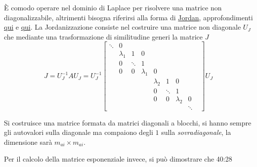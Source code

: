 È comodo operare nel dominio di Laplace per risolvere una matrice non
diagonalizzabile, altrimenti bisogna riferirsi alla forma di
\href{https://it.wikipedia.org/wiki/Forma_canonica_di_Jordan}{Jordan},
approfondimenti
\href{https://youtu.be/mD4zrWkgy0o?list=PL6Tz-CNThN13TMpt6jGje3vbOv0rzKWS7&t=
3199}{qui} e
\href{https://youtu.be/XrnbTxP010I?list=PL6Tz-CNThN13TMpt6jGje3vbOv0rzKWS7}
{qui}.
La Jordanizzazione consiste nel costruire una matrice non diagonale $U_J$ che
mediante una trasformazione di similitudine generi la matrice $J$
$$ J = U_J^{-1}AU_J =U_J^{-1}
\begin{bmatrix}
\ddots & 0 & & & \\
 & \lambda_1 & 1 & 0 & & & &\\
 & 0 & \ddots & 1 &  & & \\
 & 0 & 0 & \lambda_1 & 0 & \\
 & & & & \lambda_2 & 1 & 0 \\
 & & & & 0& \ddots & 1 \\
 & & & & 0 & 0 & \lambda_2 & 0 &\\
 & & & & & &  & \ddots
\end{bmatrix}U_J
$$

Si costruisce una matrice formata da matrici diagonali a blocchi, si hanno
sempre gli autovalori sulla diagonale ma compaiono degli $1$ sulla
\textit{sovradiagonale}, la dimensione sarà $m_{ai}\times m_{ai}$.

Per il calcolo della matrice esponenziale invece, si può dimostrare che 40:28
